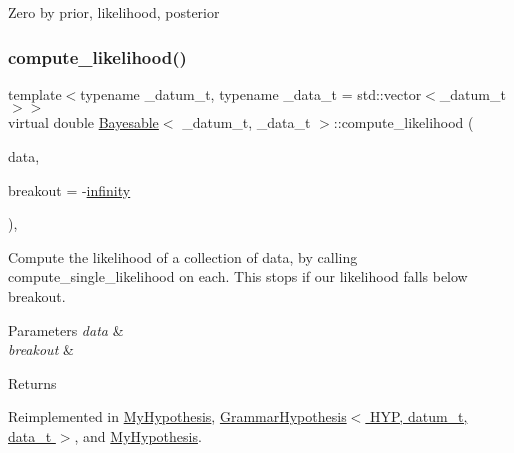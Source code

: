 Zero by prior, likelihood, posterior\mbox{\label{class_bayesable_a202493156cec15937bee304d807fdbdb}} 
\subsubsection{\texorpdfstring{compute\+\_\+likelihood()}{compute\_likelihood()}}
{\footnotesize\ttfamily template$<$typename \+\_\+datum\+\_\+t, typename \+\_\+data\+\_\+t = std\+::vector$<$\+\_\+datum\+\_\+t$>$$>$ \\
virtual double \hyperlink{class_bayesable}{Bayesable}$<$ \+\_\+datum\+\_\+t, \+\_\+data\+\_\+t $>$\+::compute\+\_\+likelihood (\begin{DoxyParamCaption}\item[{const \hyperlink{class_bayesable_aa2788c4d7718c0a824e1d28c4c98f921}{data\+\_\+t} \&}]{data,  }\item[{const double}]{breakout = {\ttfamily -\/\hyperlink{_numerics_8h_a1bb1e42ae1b40cad6e99da0aab8a5576}{infinity}} }\end{DoxyParamCaption})\hspace{0.3cm}{\ttfamily [inline]}, {\ttfamily [virtual]}}



Compute the likelihood of a collection of data, by calling compute\+\_\+single\+\_\+likelihood on each. This stops if our likelihood falls below breakout. 


\begin{DoxyParams}{Parameters}
{\em data} & \\
\hline
{\em breakout} & \\
\hline
\end{DoxyParams}
\begin{DoxyReturn}{Returns}

\end{DoxyReturn}


Reimplemented in \hyperlink{class_my_hypothesis_a42d7d139cd23f30342e1393fd0873dd1}{My\+Hypothesis}, \hyperlink{class_grammar_hypothesis_a35008279d3455087b7ea541f3259becb}{Grammar\+Hypothesis$<$ H\+Y\+P, datum\+\_\+t, data\+\_\+t $>$}, and \hyperlink{class_my_hypothesis_ad5cd40d67c9b6fb61311a5f4a08df426}{My\+Hypothesis}.

\mbox{\label{class_bayesable_a0b0552923602bcab6c768581ab8c7df8}} 

